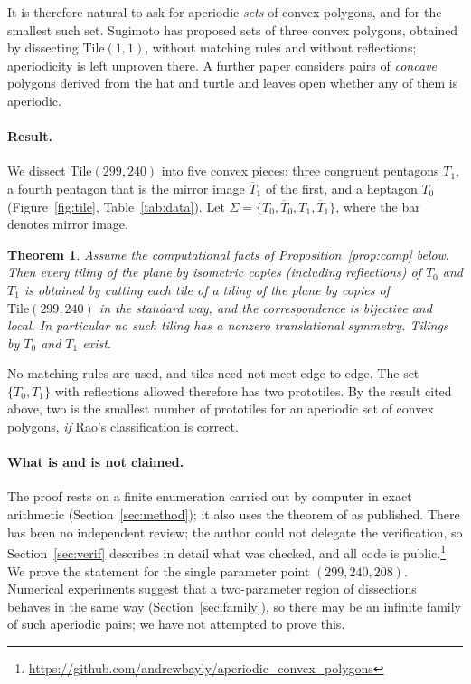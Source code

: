 \documentclass[11pt]{article}
\newtheorem{theorem}{Theorem}
\theoremstyle{remark}
\newcommand{\Tz}{T_0}
\newcommand{\To}{T_1}
\newcommand{\Tob}{\overline{T}_1}
\newcommand{\Tzb}{\overline{T}_0}
\begin{document}
It is therefore natural to ask for aperiodic \emph{sets} of convex polygons, and for the smallest such set. Sugimoto \cite{Sug24} has proposed sets of three convex polygons, obtained by dissecting $\mathrm{Tile}(1,1)$, without matching rules and without reflections; aperiodicity is left unproven there. A further paper \cite{Sug26} considers pairs of \emph{concave} polygons derived from the hat and turtle and leaves open whether any of them is aperiodic.

\paragraph{Result.} We dissect $\mathrm{Tile}(299,240)$ into five convex pieces: three congruent pentagons $\To$, a fourth pentagon that is the mirror image $\Tob$ of the first, and a heptagon $\Tz$ (Figure~\ref{fig:tile}, Table~\ref{tab:data}). Let $\Sigma=\{\Tz,\Tzb,\To,\Tob\}$, where the bar denotes mirror image.

\begin{theorem}\label{thm:main}
Assume the computational facts of Proposition~\ref{prop:comp} below. Then every tiling of the plane by isometric copies (including reflections) of $\Tz$ and $\To$ is obtained by cutting each tile of a tiling of the plane by copies of $\mathrm{Tile}(299,240)$ in the standard way, and the correspondence is bijective and local. In particular no such tiling has a nonzero translational symmetry. Tilings by $\Tz$ and $\To$ exist.
\end{theorem}

No matching rules are used, and tiles need not meet edge to edge. The set $\{\Tz,\To\}$ with reflections allowed therefore has two prototiles. By the result cited above, two is the smallest number of prototiles for an aperiodic set of convex polygons, \emph{if} Rao's classification is correct.

\paragraph{What is and is not claimed.} The proof rests on a finite enumeration carried out by computer in exact arithmetic (Section~\ref{sec:method}); it also uses the theorem of \cite{SMKG24} as published. There has been no independent review; the author could not delegate the verification, so Section~\ref{sec:verif} describes in detail what was checked, and all code is public.\footnote{\url{https://github.com/andrewbayly/aperiodic_convex_polygons}} We prove the statement for the single parameter point $(299,240,208)$. Numerical experiments suggest that a two-parameter region of dissections behaves in the same way (Section~\ref{sec:family}), so there may be an infinite family of such aperiodic pairs; we have not attempted to prove this.
\end{document}

